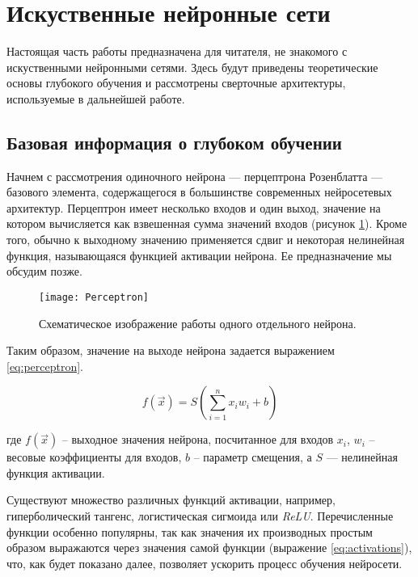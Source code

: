 \section{Искуственные нейронные сети}

\indent
\indent
Настоящая часть работы предназначена для читателя, не знакомого с 
искуственными нейронными сетями. Здесь будут приведены теоретические 
основы глубокого обучения и рассмотрены сверточные архитектуры, 
используемые в дальнейшей работе.

\subsection{Базовая информация о глубоком обучении}

\indent
\indent
Начнем с рассмотрения одиночного нейрона
 --- перцептрона Розенблатта --- базового элемента, содержащегося в большинстве современных нейросетевых архитектур.
Перцептрон имеет несколько входов и один выход, значение на котором
вычисляется как взвешенная сумма значений входов 
(рисунок \ref{tikzpicture: perceptron}).
Кроме того, обычно
к выходному значению применяется сдвиг и некоторая нелинейная функция, 
называющаяся функцией активации нейрона. Ее предназначение мы обсудим позже.

\begin{figure}[h!]
    \begin{center}
   	    \texttt{[image: Perceptron]}
   	\end{center}
   	\caption{Схематическое изображение работы одного отдельного нейрона.}
   	\label{tikzpicture: perceptron}
\end{figure}


\indent
\indent
Таким образом, значение на выходе нейрона задается
 выражением \ref{eq:perceptron}.

\begin{equation}\label{eq:perceptron}
    f(\vec{x}) = S(\sum_{i=1}^n x_i w_i + b)
\end{equation}


где $f(\vec{x})$ -- выходное значения нейрона, посчитанное для входов $x_i$,
$w_i$ -- весовые коэффициенты для входов, $b$ -- параметр смещения, 
а $S$ --- нелинейная функция активации.

\indent
\indent
Существуют множество различных функций активации, например, гиперболический
тангенс, логистическая сигмоида или \textit{ReLU}. Перечисленные
функции особенно популярны, так как значения их производных простым образом 
выражаются через значения самой функции (выражение \ref{eq:activations}), 
что, как будет показано далее, позволяет
ускорить процесс обучения нейросети.


